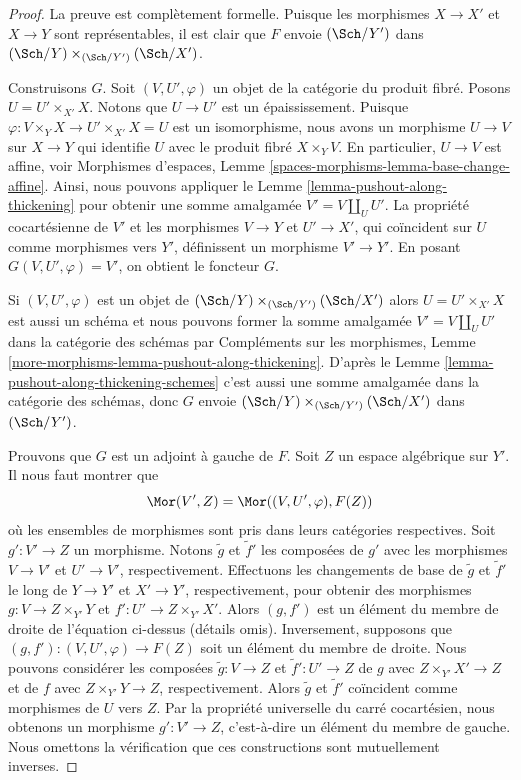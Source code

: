\begin{proof} La preuve est complètement formelle. Puisque les morphismes $X \to X'$ et $X \to Y$ sont représentables, il est clair que $F$ envoie $(\Sch/Y')$ dans $(\Sch/Y) \times_{(\Sch/Y')} (\Sch/X')$.

\medskip\noindent
Construisons $G$. Soit $(V, U', \varphi)$ un objet de la catégorie du produit fibré. Posons $U = U' \times_{X'} X$. Notons que $U \to U'$ est un épaississement. Puisque $\varphi : V \times_Y X \to U' \times_{X'} X = U$ est un isomorphisme, nous avons un morphisme $U \to V$ sur $X \to Y$ qui identifie $U$ avec le produit fibré $X \times_Y V$. En particulier, $U \to V$ est affine, voir Morphismes d'espaces, Lemme \ref{spaces-morphisms-lemma-base-change-affine}. 
Ainsi, nous pouvons appliquer le Lemme \ref{lemma-pushout-along-thickening} pour obtenir une somme amalgamée $V' = V \amalg_U U'$. La propriété cocartésienne de $V'$ et les morphismes $V \to Y$ et $U' \to X'$, qui coïncident sur $U$ comme morphismes vers $Y'$, définissent un morphisme $V' \to Y'$. En posant $G(V, U', \varphi) = V'$, on obtient le foncteur $G$.

\medskip\noindent
Si $(V, U', \varphi)$ est un objet de $(\Sch/Y) \times_{(\Sch/Y')} (\Sch/X')$
alors $U = U' \times_{X'} X$ est aussi un schéma et nous pouvons former la somme amalgamée
$V' = V \amalg_U U'$ dans la catégorie des schémas par
Compléments sur les morphismes, Lemme \ref{more-morphisms-lemma-pushout-along-thickening}.
D'après le Lemme \ref{lemma-pushout-along-thickening-schemes}
c'est aussi une somme amalgamée dans la catégorie des schémas, donc
$G$ envoie $(\Sch/Y) \times_{(\Sch/Y')} (\Sch/X')$ dans $(\Sch/Y')$.

\medskip\noindent
Prouvons que $G$ est un adjoint à gauche de $F$. Soit $Z$ un espace algébrique sur $Y'$. Il nous faut montrer que
$$
\Mor(V', Z) = \Mor((V, U', \varphi), F(Z))
$$
où les ensembles de morphismes sont pris dans leurs catégories respectives.
Soit $g' : V' \to Z$ un morphisme. Notons $\tilde g$ et $\tilde f'$ les composées de $g'$ avec les morphismes $V \to V'$ et $U' \to V'$, respectivement.
Effectuons les changements de base de $\tilde g$ et $\tilde f'$ le long de $Y \to Y'$ et $X' \to Y'$, respectivement, pour obtenir des morphismes $g : V \to Z \times_{Y'} Y$ et $f' : U' \to Z \times_{Y'} X'$. Alors $(g, f')$ est un élément du membre de droite de l'équation ci-dessus (détails omis).
Inversement, supposons que $(g, f') : (V, U', \varphi) \to F(Z)$ soit un élément du membre de droite. Nous pouvons considérer les composées $\tilde g : V \to Z$ et $\tilde f' : U' \to Z$ de $g$ avec $Z \times_{Y'} X' \to Z$ et de $f$ avec $Z \times_{Y'} Y \to Z$, respectivement. Alors $\tilde g$ et $\tilde f'$ coïncident comme morphismes de $U$ vers $Z$. Par la propriété universelle du carré cocartésien, nous obtenons un morphisme $g' : V' \to Z$, c'est-à-dire un élément du membre de gauche. Nous omettons la vérification que ces constructions sont mutuellement inverses. 
\end{proof}

